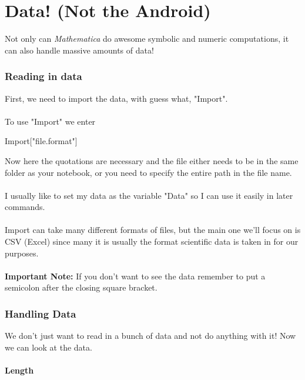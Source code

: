 \documentclass[11pt,a4paper,twoside]{article}
\begin{document}
\newpage
				
	\part{Data! (Not the Android)}
	
		Not only can \textit{Mathematica} do awesome symbolic and numeric computations, it can also handle massive amounts of data!
		
		\section{Reading in data}
		
			First, we need to import the data, with guess what, "Import".
			\\
			\\
			To use "Import" we enter 
			
			\begin{center}
			
				Import["file.format"]
			
			\end{center}
			
			Now here the quotations are necessary and the file either needs to be in the same folder as your notebook, or you need to specify the entire path in the file name.
			\\
			\\
			I usually like to set my data as the variable "Data" so I can use it easily in later commands.
			\\
			\\
			Import can take many different formats of files, but the main one we'll focus on is CSV (Excel) since many it is usually the format scientific data is taken in for our purposes.
			\\
			\\
			\textbf{Important Note:} If you don't want to see the data remember to put a semicolon after the closing square bracket.
			
		\section{Handling Data}
		
			We don't just want to read in a bunch of data and not do anything with it!  Now we can look at the data.
			
			\subsection{Length}			
					
\end{document}
